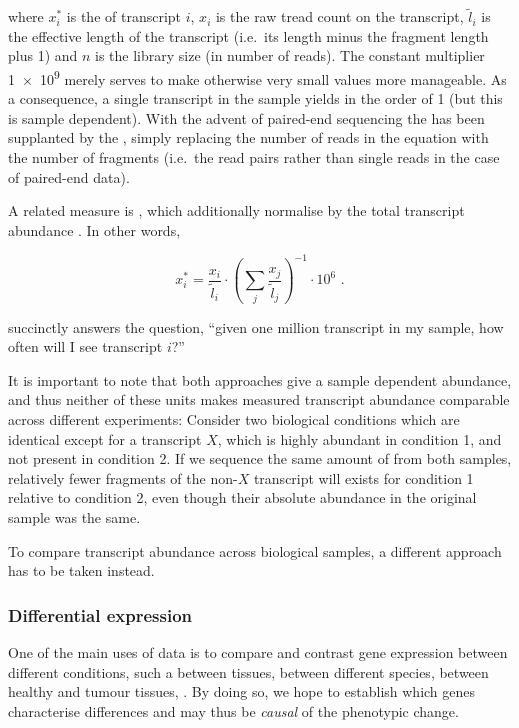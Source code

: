 where \(x^*_i\) is the \rpkm of transcript \(i\), \(x_i\) is the raw tread count
on the transcript, \(\tilde l_i\) is the effective length of the transcript
(i.e.\ its length minus the fragment length plus \num{1}) and \(n\) is the
library size (in number of reads). The constant multiplier \num{1e9} merely
serves to make otherwise very small values more manageable. As a consequence, a
single transcript in the sample yields in the order of \SI{1}{\rpkm} (but this
is sample dependent). With the advent of paired-end sequencing the \rpkm has
been supplanted by the \fpkm, simply replacing the number of reads in the
equation with the number of fragments (i.e.\ the read pairs rather than single
reads in the case of paired-end data).

A related measure is \tpm, which additionally normalise by the total transcript
abundance \citep{Li:2010}. In other words,

\begin{equation}
    x^*_i = \frac{x_i}{\tilde l_i} \cdot \left(\sum_j{\frac{x_j}{\tilde
        l_j}}\right)^{-1} \cdot 10^6 \text{\ .}
\end{equation}

\tpm succinctly answers the question, “given one million transcript in my
sample, how often will I see transcript \(i\)?”

It is important to note that both approaches give a sample dependent abundance,
and thus neither of these units makes measured transcript abundance comparable
across different experiments: Consider two biological conditions which are
identical except for a transcript \(X\), which is highly abundant in condition
\num{1}, and not present in condition \num{2}. If we sequence the same amount of
\mrna from both samples, relatively fewer fragments of the non-\(X\) transcript
will exists for condition \num{1} relative to condition \num{2}, even though
their absolute abundance in the original sample was the same.

To compare transcript abundance across biological samples, a different approach
has to be taken instead.

\subsubsection{Differential expression}

One of the main uses of \rnaseq data is to compare and contrast gene expression
between different conditions, such a between tissues, between different species,
between healthy and tumour tissues, \etc. By doing so, we hope to establish
which genes characterise differences and may thus be \emph{causal} of the
phenotypic change.

